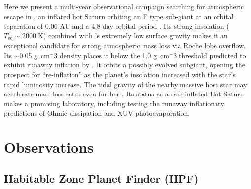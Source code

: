 \documentclass[twocolumn]{aastex631}
\begin{document}
Here we present a multi-year observational campaign searching for atmospheric escape in , an inflated hot Saturn orbiting an F type sub-giant at an orbital separation of 0.06 AU and a 4.8-day orbital period \citep{2017AJ....153..211Z}.  Its strong insolation ($T_\mathrm{eq}\sim2000\;$K) combined with 's extremely low surface gravity makes it an exceptional candidate for strong atmospheric mass loss via Roche lobe overflow.  Its $\sim$0.05 g~cm$^-3$ density places it below the 1.0 g~cm$^-3$ threshold predicted to exhibit runaway inflation by \citet{2023ApJ...945L..36T}.  It orbits a possibly evolved subgiant, opening the prospect for ``re-inflation'' \citep{2022AJ....163...53S,2022AJ....163..120G,2023arXiv230306728G} as the planet's insolation increased with the star's rapid luminosity increase.  The tidal gravity of the nearby massive host star may accelerate mass loss rates even further \citep{2007A&A...472..329E,2023ApJ...945L..36T}. Its status as a rare inflated Hot Saturn makes  a promising laboratory, including testing the runaway inflationary predictions of Ohmic dissipation and XUV photoevaporation.


\section{Observations}
\subsection{Habitable Zone Planet Finder (HPF)}
\end{document}
